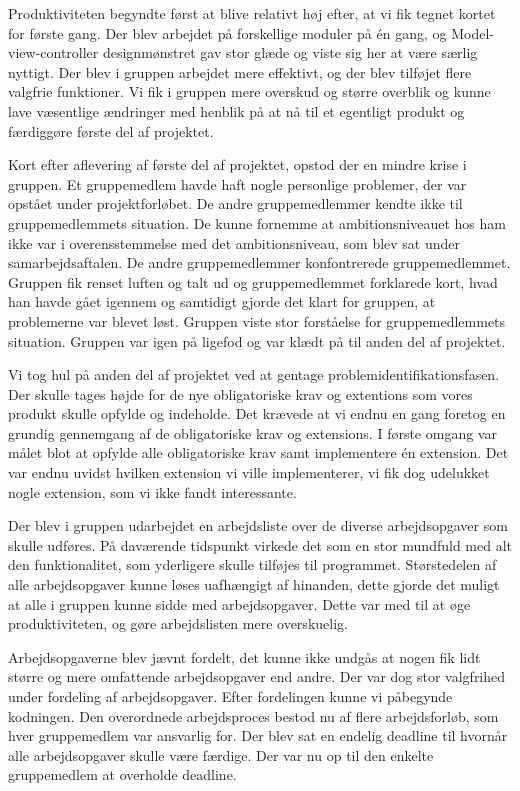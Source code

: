 Produktiviteten begyndte først at blive relativt høj efter, at vi fik tegnet kortet for første gang. Der blev arbejdet på forskellige moduler på én gang, og Model-view-controller designmønstret gav stor glæde og viste sig her at være særlig nyttigt. Der blev i gruppen arbejdet mere effektivt, og der blev tilføjet flere valgfrie funktioner. Vi fik i gruppen mere overskud og større overblik og kunne lave væsentlige ændringer med henblik på at nå til et egentligt produkt og færdiggøre første del af projektet. 

Kort efter aflevering af første del af projektet, opstod der en mindre krise i gruppen. Et gruppemedlem havde haft nogle personlige problemer, der var opstået under projektforløbet. De andre gruppemedlemmer kendte ikke til gruppemedlemmets situation. De kunne fornemme at ambitionsniveauet hos ham ikke var i overensstemmelse med det ambitionsniveau, som blev sat under samarbejdsaftalen. De andre gruppemedlemmer konfontrerede gruppemedlemmet. Gruppen fik renset luften og talt ud og gruppemedlemmet forklarede kort, hvad han havde gået igennem og samtidigt gjorde det klart for gruppen, at problemerne var blevet løst. Gruppen viste stor forståelse for gruppemedlemmets situation. Gruppen var igen på ligefod og var klædt på til anden del af projektet. 

Vi tog hul på anden del af projektet ved at gentage problemidentifikationsfasen. Der skulle tages højde for de nye obligatoriske krav og extentions som vores produkt skulle opfylde og indeholde. Det krævede at vi endnu en gang foretog en grundig gennemgang af de obligatoriske krav og extensions. I første omgang var målet blot at opfylde alle obligatoriske krav samt implementere én extension. Det var endnu uvidst hvilken extension vi ville implementerer, vi fik dog udelukket nogle extension, som vi ikke fandt interessante. 

Der blev i gruppen udarbejdet en arbejdsliste over de diverse arbejdsopgaver som skulle udføres. På daværende tidspunkt virkede det som en stor mundfuld med alt den funktionalitet, som yderligere skulle tilføjes til programmet. Størstedelen af alle arbejdsopgaver kunne løses uafhængigt af hinanden, dette gjorde det muligt at alle i gruppen kunne sidde med arbejdsopgaver. Dette var med til at øge produktiviteten, og gøre arbejdslisten mere overskuelig.  

Arbejdsopgaverne blev jævnt fordelt, det kunne ikke undgås at nogen fik lidt større og mere omfattende arbejdsopgaver end andre. Der var dog stor valgfrihed under fordeling af arbejdsopgaver. Efter fordelingen kunne vi påbegynde kodningen. Den overordnede arbejdsproces bestod nu af flere arbejdsforløb, som hver gruppemedlem var ansvarlig for. Der blev sat en endelig deadline til hvornår alle arbejdsopgaver skulle være færdige. Der var nu op til den enkelte gruppemedlem at overholde deadline. 

